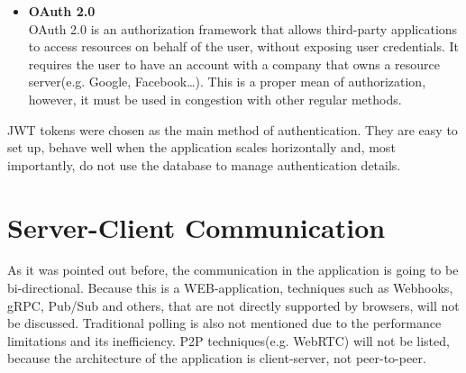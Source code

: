 \begin{itemize}
    \item \textbf{OAuth 2.0} \\
    OAuth 2.0 is an authorization framework that allows third-party applications to access resources
    on behalf of the user, without exposing user credentials.\cite{oauth2} It requires the user to have an account
    with a company that owns a resource server(e.g. Google, Facebook\ldots). This is a proper mean of
    authorization, however, it must be used in congestion with other regular methods.
\end{itemize}

JWT tokens were chosen as the main method of authentication. They are easy to set up, behave well when the
application scales horizontally and, most importantly, do not use the database to manage authentication details.


\section{Server-Client Communication}
As it was pointed out before, the communication in the application is going to be bi-directional.
Because this is a WEB-application, techniques such as Webhooks, gRPC, Pub/Sub and
others, that are not directly supported by browsers, will not be discussed. Traditional polling is also not mentioned due
to the performance limitations and its inefficiency. P2P techniques(e.g. WebRTC) will not be listed,
because the architecture of the application is client-server, not peer-to-peer.

